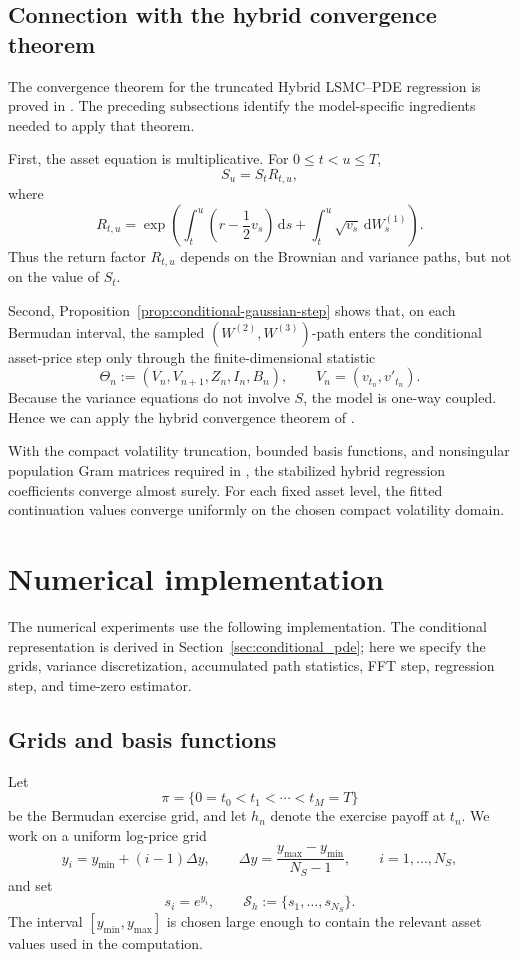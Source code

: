 \documentclass[pdflatex,sn-mathphys-num]{sn-jnl}
\theoremstyle{thmstyleone}%
\theoremstyle{thmstylethree}%
\theoremstyle{thmstyletwo}%
\newcommand{\dd}{\mathrm d}
\begin{document}
\subsection{Connection with the hybrid convergence theorem}\label{sec:as_convergence}

The convergence theorem for the truncated Hybrid LSMC--PDE regression is proved
in \cite{farahany2020mixing}. The preceding subsections identify the
model-specific ingredients needed to apply that theorem.

First, the asset equation is multiplicative. For $0\le t<u\le T$,
$$
S_u=S_tR_{t,u},
$$
where
$$
R_{t,u}
=
\exp\left(
\int_t^u\left(r-\frac12v_s\right)\,\dd s
+
\int_t^u\sqrt{v_s}\,\dd W_s^{(1)}
\right).
$$
Thus the return factor $R_{t,u}$ depends on the Brownian and variance paths,
but not on the value of $S_t$.

Second, Proposition~\ref{prop:conditional-gaussian-step} shows that, on each
Bermudan interval, the sampled $(W^{(2)},W^{(3)})$-path enters the conditional
asset-price step only through the finite-dimensional statistic
$$
\Theta_n
:=
(V_n,V_{n+1},Z_n,I_n,B_n),
\qquad
V_n=(v_{t_n},v'_{t_n}).
$$
Because the variance equations do not involve $S$, the model is one-way
coupled. Hence we can apply the hybrid convergence theorem of
\cite[Theorem~1]{farahany2020mixing}.

With the compact volatility truncation, bounded basis functions, and nonsingular
population Gram matrices required in \cite{farahany2020mixing}, the stabilized
hybrid regression coefficients converge almost surely. For each fixed asset
level, the fitted continuation values converge uniformly on the chosen compact
volatility domain.

\section{Numerical implementation}
\label{sec:hybrid-method}

The numerical experiments use the following implementation. The conditional
representation is derived in Section~\ref{sec:conditional_pde}; here we specify
the grids, variance discretization, accumulated path statistics, FFT step,
regression step, and time-zero estimator. 

\subsection{Grids and basis functions}
Let
$$
\pi=\{0=t_0<t_1<\cdots<t_M=T\}
$$
be the Bermudan exercise grid, and let $h_n$ denote the exercise payoff at
$t_n$. We work on a uniform log-price grid
$$
y_i=y_{\min}+(i-1)\Delta y,
\qquad
\Delta y=\frac{y_{\max}-y_{\min}}{N_S-1},
\qquad
i=1,\ldots,N_S,
$$
and set
$$
s_i=e^{y_i},
\qquad
\mathcal S_h:=\{s_1,\ldots,s_{N_S}\}.
$$
The interval $[y_{\min},y_{\max}]$ is chosen large enough to contain the
relevant asset values used in the computation.
\end{document}
